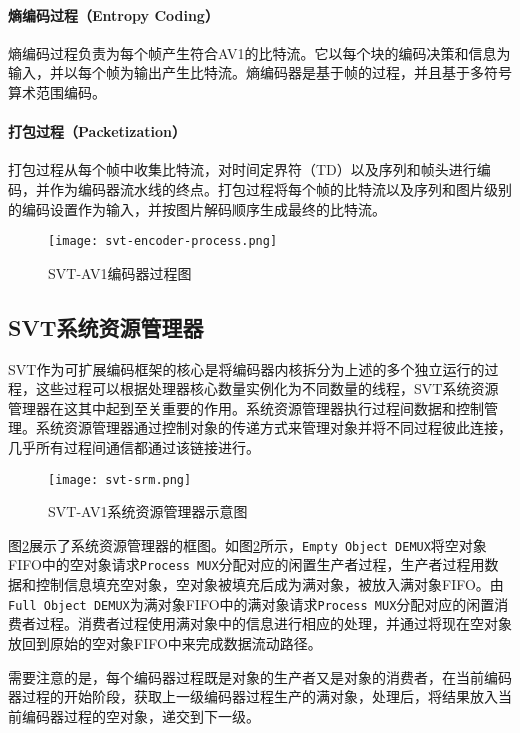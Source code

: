   \paragraph{熵编码过程（Entropy Coding）} 熵编码过程负责为每个帧产生符合AV1的比特流。它以每个块的编码决策和信息为输入，并以每个帧为输出产生比特流。熵编码器是基于帧的过程，并且基于多符号算术范围编码。

  \paragraph{打包过程（Packetization）} 打包过程从每个帧中收集比特流，对时间定界符（TD）以及序列和帧头进行编码，并作为编码器流水线的终点。打包过程将每个帧的比特流以及序列和图片级别的编码设置作为输入，并按图片解码顺序生成最终的比特流。
  \begin{figure}[!htp]
    \centering
    \texttt{[image: svt-encoder-process.png]}
    \caption{SVT-AV1编码器过程图\cite{EncoderDesignSVTAV1}}
  \label{fig:svt-encoder-process}
  \end{figure}

\subsection{SVT系统资源管理器}

  SVT作为可扩展编码框架的核心是将编码器内核拆分为上述的多个独立运行的过程，这些过程可以根据处理器核心数量实例化为不同数量的线程，SVT系统资源管理器在这其中起到至关重要的作用\cite{EncoderDesignSVTAV1}。系统资源管理器执行过程间数据和控制管理。系统资源管理器通过控制对象的传递方式来管理对象并将不同过程彼此连接，几乎所有过程间通信都通过该链接进行。

  \begin{figure}[!htp]
    \centering
    \texttt{[image: svt-srm.png]}
    \caption{SVT-AV1系统资源管理器示意图\cite{EncoderDesignSVTAV1}}
  \label{fig:svt-srm}
  \end{figure}

  图\ref{fig:svt-srm}展示了系统资源管理器的框图。如图\ref{fig:svt-srm}所示，\texttt{Empty Object DEMUX}将空对象FIFO中的空对象请求\texttt{Process MUX}分配对应的闲置生产者过程，生产者过程用数据和控制信息填充空对象，空对象被填充后成为满对象，被放入满对象FIFO。由\texttt{Full Object DEMUX}为满对象FIFO中的满对象请求\texttt{Process MUX}分配对应的闲置消费者过程。消费者过程使用满对象中的信息进行相应的处理，并通过将现在空对象放回到原始的空对象FIFO中来完成数据流动路径。

  需要注意的是，每个编码器过程既是对象的生产者又是对象的消费者，在当前编码器过程的开始阶段，获取上一级编码器过程生产的满对象，处理后，将结果放入当前编码器过程的空对象，递交到下一级。

